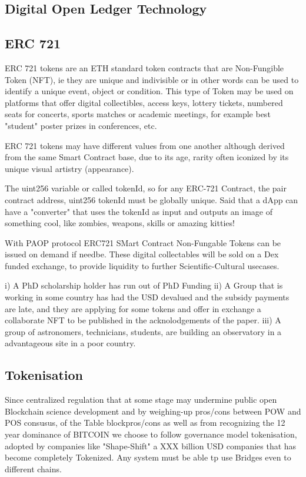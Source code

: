 \documentclass[final,5p,times,twocolumn,authoryear]{elsarticle}
\begin{document}
\subsection{Digital Open Ledger Technology}

\subsection{ERC 721 }

ERC 721 tokens are an ETH standard token contracts that are Non-Fungible Token (NFT), ie they are unique and indivisible or in other words can be used to identify a unique event, object or condition. This type of Token may be used on platforms that offer digital collectibles, access keys, lottery tickets, numbered seats for concerts, sports matches or academic meetings, for example best "student" poster prizes in conferences, etc. 

ERC 721 tokens may have different values from one another although derived from the same Smart Contract base, due to its age, rarity often iconized by its unique visual artistry (appearance).

The uint256 variable or called tokenId, so for any ERC-721 Contract, the pair contract address, uint256 tokenId must be globally unique. Said that a dApp can have a "converter" that uses the tokenId as input and outputs an image of something cool, like zombies, weapons, skills or amazing kitties!


With PAOP protocol ERC721 SMart Contract Non-Fungable Tokens can be issued on demand if needbe. These digital collectables will be sold on a Dex funded exchange, to provide liquidity to further Scientific-Cultural usecases.

i) A PhD scholarship holder has run out of PhD Funding 
ii) A Group that is working in some country has had the USD devalued and the subsidy payments are late, and they are applying for some tokens and offer in exchange a collaborate NFT to be published in the acknolodgements of the paper.
iii) A group of astronomers, technicians, students,  are building an observatory in a advantageous site in a poor country. 

\subsection{Tokenisation}

Since centralized regulation that at some stage may undermine public open Blockchain science development and by weighing-up pros/cons between POW and POS consusus, of the Table blockpros/cons as well as from recognizing the 12 year dominance of BITCOIN we choose to follow governance model tokenisation, adopted by  companies like "Shape-Shift" a XXX billion USD companies that has become completely Tokenized. Any system must be able tp use Bridges even to different chains. 
\end{document}
